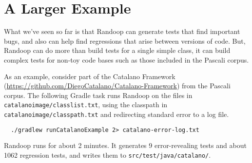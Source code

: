 \documentclass[11pt, oneside]{article} %
\begin{document}
\section{A Larger Example}\label{largerexample}
What we've seen so far is that Randoop can generate tests that find important bugs, and also can help find regressions that arise between versions of code. 
But, Randoop can do more than build tests for a single simple class, it can build complex tests for non-toy code bases such as those included in the Pascali corpus.

As an example, consider part of the Catalano Framework
(\url{https://github.com/DiegoCatalano/Catalano-Framework}) from the
Pascali corpus.
The following Gradle task runs Randoop on the files in \texttt{catalanoimage/classlist.txt},
using the classpath in \texttt{catalanoimage/classpath.txt}
and redirecting standard error to a log file.
\begin{verbatim}
  ./gradlew runCatalanoExample 2> catalano-error-log.txt
\end{verbatim}
Randoop runs for about 2 minutes.
It generates 9 error-revealing tests and about 1062 regression tests, and writes
them to \texttt{src/test/java/catalano/}.
\end{document}
